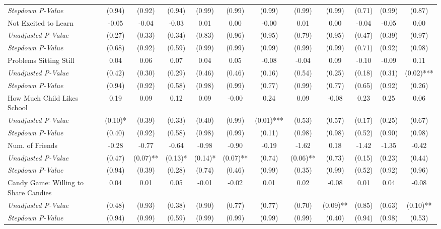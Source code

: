 \begin{tabular}{l c c c c c c c c c c c}
\quad \textit{Stepdown P-Value} & (0.94) & (0.92) & (0.94) & (0.99) & (0.99) & (0.99) & (0.99) & (0.99) & (0.71) & (0.99) & (0.87) \\
Not Excited to Learn & -0.05 & -0.04 & -0.03 & 0.01 & 0.00 & -0.00 & 0.01 & 0.00 & -0.04 & -0.05 & 0.00 \\
\quad \textit{Unadjusted P-Value} & (0.27) & (0.33) & (0.34) & (0.83) & (0.96) & (0.95) & (0.79) & (0.95) & (0.47) & (0.39) & (0.97) \\
\quad \textit{Stepdown P-Value} & (0.68) & (0.92) & (0.59) & (0.99) & (0.99) & (0.99) & (0.99) & (0.99) & (0.71) & (0.92) & (0.98) \\
Problems Sitting Still & 0.04 & 0.06 & 0.07 & 0.04 & 0.05 & -0.08 & -0.04 & 0.09 & -0.10 & -0.09 & 0.11 \\
\quad \textit{Unadjusted P-Value} & (0.42) & (0.30) & (0.29) & (0.46) & (0.46) & (0.16) & (0.54) & (0.25) & (0.18) & (0.31) & (0.02)*** \\
\quad \textit{Stepdown P-Value} & (0.94) & (0.92) & (0.58) & (0.98) & (0.99) & (0.77) & (0.99) & (0.77) & (0.65) & (0.92) & (0.26) \\
How Much Child Likes School & 0.19 & 0.09 & 0.12 & 0.09 & -0.00 & 0.24 & 0.09 & -0.08 & 0.23 & 0.25 & 0.06 \\
\quad \textit{Unadjusted P-Value} & (0.10)* & (0.39) & (0.33) & (0.40) & (0.99) & (0.01)*** & (0.53) & (0.57) & (0.17) & (0.25) & (0.67) \\
\quad \textit{Stepdown P-Value} & (0.40) & (0.92) & (0.58) & (0.98) & (0.99) & (0.11) & (0.98) & (0.98) & (0.52) & (0.90) & (0.98) \\
Num. of Friends & -0.28 & -0.77 & -0.64 & -0.98 & -0.90 & -0.19 & -1.62 & 0.18 & -1.42 & -1.35 & -0.42 \\
\quad \textit{Unadjusted P-Value} & (0.47) & (0.07)** & (0.13)* & (0.14)* & (0.07)** & (0.74) & (0.06)** & (0.73) & (0.15) & (0.23) & (0.44) \\
\quad \textit{Stepdown P-Value} & (0.94) & (0.39) & (0.28) & (0.74) & (0.46) & (0.99) & (0.35) & (0.99) & (0.52) & (0.92) & (0.96) \\
Candy Game: Willing to Share Candies & 0.04 & 0.01 & 0.05 & -0.01 & -0.02 & 0.01 & 0.02 & -0.08 & 0.01 & 0.04 & -0.08 \\
\quad \textit{Unadjusted P-Value} & (0.48) & (0.93) & (0.38) & (0.90) & (0.77) & (0.77) & (0.70) & (0.09)** & (0.85) & (0.63) & (0.10)** \\
\quad \textit{Stepdown P-Value} & (0.94) & (0.99) & (0.59) & (0.99) & (0.99) & (0.99) & (0.99) & (0.40) & (0.94) & (0.98) & (0.53) \\
\bottomrule
\end{tabular}
